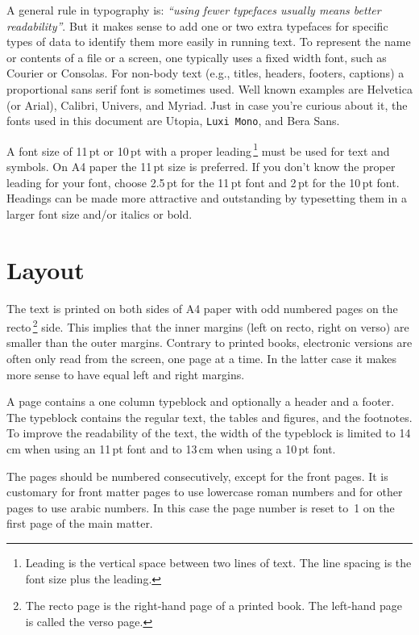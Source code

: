 \documentclass[11pt,article,oneside,a4paper]{memoir}
\newcommand*\rmfontname{Utopia}
\newcommand*\sffontname{Bera Sans}}%
\newcommand*\sffontname{Helvetica}}
\newcommand*\ttfontname{Luxi Mono}}%
\newcommand*\ttfontname{Latin Modern Typewriter}}
\begin{document}
A general rule in typography is: \emph{``using fewer typefaces usually means
  better readability''}. But it makes sense to add one or two extra
typefaces for specific types of data to identify them more easily in
running text. To represent the name or contents of a file or a screen, one
typically uses a fixed width font, such as Courier or Consolas. For
non-body text (e.g., titles, headers, footers, captions) a proportional
sans serif font is sometimes used. Well known examples are Helvetica (or
Arial), Calibri, Univers, and Myriad. Just in case you're curious about it,
the fonts used in this document are \rmfontname, \texttt{\ttfontname}, and
\textsf{\sffontname}.

A font size of 11\,pt or 10\,pt with a proper leading\,\footnote{Leading is
  the vertical space between two lines of text. The line spacing is the
  font size plus the leading.} must be used for text and symbols. On A4
paper the 11\,pt size is preferred. If you don't know the proper leading
for your font, choose 2.5\,pt for the 11\,pt font and 2\,pt for the 10\,pt
font. Headings can be made more attractive and outstanding by typesetting
them in a larger font size and/or italics or bold.

\section{Layout}
The text is printed on both sides of A4 paper with odd numbered pages on
the recto\,\footnote{The recto page is the right-hand page of a printed
  book. The left-hand page is called the verso page.} side. This implies
that the inner margins (left on recto, right on verso) are smaller than the
outer margins. Contrary to printed books, electronic versions are often
only read from the screen, one page at a time. In the latter case it makes
more sense to have equal left and right margins.

A page contains a one column typeblock and optionally a header and a
footer. The typeblock contains the regular text, the tables and figures,
and the footnotes. To improve the readability of the text, the width of the
typeblock is limited to 14\,cm when using an 11\,pt font and to 13\,cm when
using a 10\,pt font.

The pages should be numbered consecutively, except for the front pages. It
is customary for front matter pages to use lowercase roman numbers and for
other pages to use arabic numbers. In this case the page number is reset
to~1 on the first page of the main matter.
\end{document}
